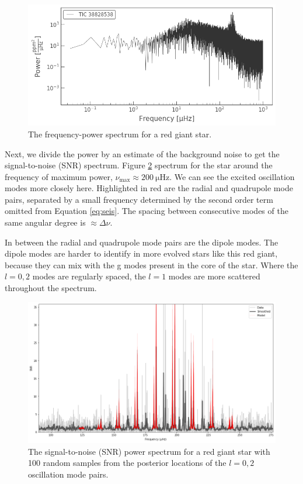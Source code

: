 \begin{figure}
    \centering
    \includegraphics[width=0.8\linewidth]{introduction/images/sprectrum.png}
    \caption{The frequency-power spectrum for a red giant star.}
    \label{fig:spec}
\end{figure}

Next, we divide the power by an estimate of the background noise to get the signal-to-noise (SNR) spectrum. Figure \ref{fig:peakbag} spectrum for the star around the frequency of maximum power, $\nu_\mathrm{max} \approx \SI{200}{\micro\hertz}$. We can see the excited oscillation modes more closely here. Highlighted in red are the radial and quadrupole mode pairs, separated by a small frequency determined by the second order term omitted from Equation \ref{eq:seis}. The spacing between consecutive modes of the same angular degree is $\approx \Delta\nu$.

In between the radial and quadrupole mode pairs are the dipole modes. The dipole modes are harder to identify in more evolved stars like this red giant, because they can mix with the g modes present in the core of the star. Where the $l=0,2$ modes are regularly spaced, the $l=1$ modes are more scattered throughout the spectrum.

\begin{figure}
    \centering
    \includegraphics[width=0.8\linewidth]{introduction/images/peakbag.png}
    \caption{The signal-to-noise (SNR) power spectrum for a red giant star with 100 random samples from the posterior locations of the $l=0,2$ oscillation mode pairs.}
    \label{fig:peakbag}
\end{figure}


